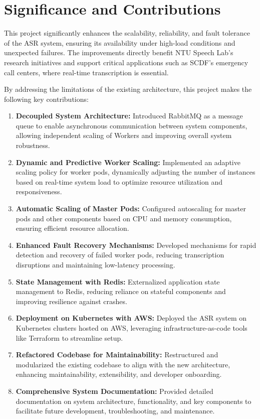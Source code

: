 \section{Significance and Contributions}
This project significantly enhances the scalability, reliability, and fault tolerance of the ASR system, ensuring its availability under high-load conditions and unexpected failures. The improvements directly benefit NTU Speech Lab’s research initiatives and support critical applications such as SCDF’s emergency call centers, where real-time transcription is essential. 

By addressing the limitations of the existing architecture, this project makes the following key contributions:

\begin{enumerate}
    \item \textbf{Decoupled System Architecture:} Introduced RabbitMQ as a message queue to enable asynchronous communication between system components, allowing independent scaling of Workers and improving overall system robustness.
    
    \item \textbf{Dynamic and Predictive Worker Scaling:} Implemented an adaptive scaling policy for worker pods, dynamically adjusting the number of instances based on real-time system load to optimize resource utilization and responsiveness.

    \item \textbf{Automatic Scaling of Master Pods:} Configured autoscaling for master pods and other components based on CPU and memory consumption, ensuring efficient resource allocation.

    \item \textbf{Enhanced Fault Recovery Mechanisms:} Developed mechanisms for rapid detection and recovery of failed worker pods, reducing transcription disruptions and maintaining low-latency processing.

    \item \textbf{State Management with Redis:} Externalized application state management to Redis, reducing reliance on stateful components and improving resilience against crashes.

    \item \textbf{Deployment on Kubernetes with AWS:} Deployed the ASR system on Kubernetes clusters hosted on AWS, leveraging infrastructure-as-code tools like Terraform to streamline setup.

    \item \textbf{Refactored Codebase for Maintainability:} Restructured and modularized the existing codebase to align with the new architecture, enhancing maintainability, extensibility, and developer onboarding.

    \item \textbf{Comprehensive System Documentation:} Provided detailed documentation on system architecture, functionality, and key components to facilitate future development, troubleshooting, and maintenance.
\end{enumerate}


